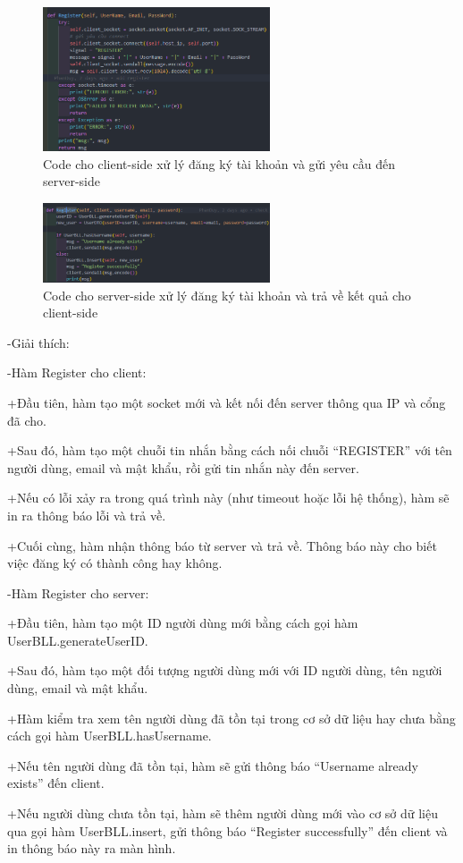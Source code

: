 \documentclass[a4paper]{article}
\begin{document}
\clearpage
\newpage
\begin{flushleft}
	\begin{figure}
		\centering
		\includegraphics[width=0.6\textwidth]{images/register-client.png}
		\caption{Code cho client-side xử lý đăng ký tài khoản và gửi yêu cầu đến server-side}
	\end{figure}
	\begin{figure}
		\centering
		\includegraphics[width=0.6\textwidth]{images/register-server.png}
		\caption{Code cho server-side xử lý đăng ký tài khoản và trả về kết quả cho client-side}
	\end{figure}

	-Giải thích:

	-Hàm Register cho client:

	+Đầu tiên, hàm tạo một socket mới và kết nối đến server thông qua IP và cổng đã cho.

	+Sau đó, hàm tạo một chuỗi tin nhắn bằng cách nối chuỗi “REGISTER” với tên người dùng, email và mật khẩu, rồi gửi tin nhắn này đến server.

	+Nếu có lỗi xảy ra trong quá trình này (như timeout hoặc lỗi hệ thống), hàm sẽ in ra thông báo lỗi và trả về.

	+Cuối cùng, hàm nhận thông báo từ server và trả về. Thông báo này cho biết việc đăng ký có thành công hay không.

	-Hàm Register cho server:

	+Đầu tiên, hàm tạo một ID người dùng mới bằng cách gọi hàm UserBLL.generateUserID\@.

	+Sau đó, hàm tạo một đối tượng người dùng mới với ID người dùng, tên người dùng, email và mật khẩu.

	+Hàm kiểm tra xem tên người dùng đã tồn tại trong cơ sở dữ liệu hay chưa bằng cách gọi hàm UserBLL.hasUsername.

	+Nếu tên người dùng đã tồn tại, hàm sẽ gửi thông báo “Username already exists” đến client.

	+Nếu người dùng chưa tồn tại, hàm sẽ thêm người dùng mới vào cơ sở dữ liệu qua gọi hàm UserBLL.insert, gửi thông báo “Register successfully” đến client và in thông báo này ra màn hình.
\end{flushleft}
\end{document}
